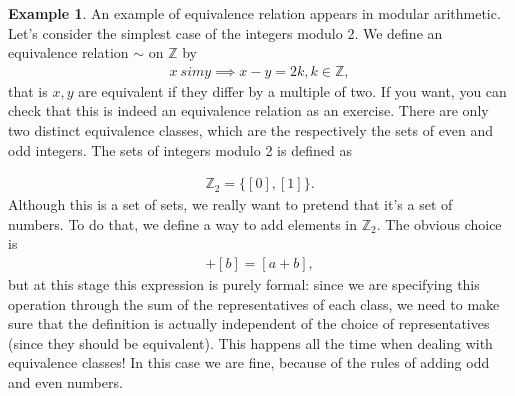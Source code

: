 \documentclass{book}
\theoremstyle{definition}
\newtheorem{exmp}{Example}[section]
\begin{document}
\begin{exmp}
	An example of equivalence relation appears in modular arithmetic. Let's consider the simplest case of the integers modulo 2. We define an equivalence relation $\sim$ on $\mathbb{Z}$ by
	\begin{align}
	x\ sim y \implies x-y = 2k, k\in \mathbb{Z},
	\end{align}
	that is $x,y$ are equivalent if they differ by a multiple of two. If you want, you can check that this is indeed an equivalence relation as an exercise. There are only two distinct equivalence classes, which are the respectively the sets of even and odd integers. The sets of integers modulo 2 is
	defined as

	\begin{align}
	\mathbb{Z}_2 = \{ [0], [1]  \}.
	\end{align}
	Although this is a set of sets, we really want to pretend that it's a set of numbers. To do
	that, we define a way to add elements in $\mathbb{Z}_2$. The obvious choice is
	\begin{align}
	[a] + [b] = [a+b],
	\end{align}
	but at this stage this expression is purely formal: since we are specifying this operation
	through the sum of the representatives of each class, we need to make sure that the definition
	is actually independent of the choice of representatives (since they should be equivalent).
	This happens all the time when dealing with equivalence classes! In this case we are fine, because of the rules of adding odd and even numbers. 
\end{exmp}
\end{document}
